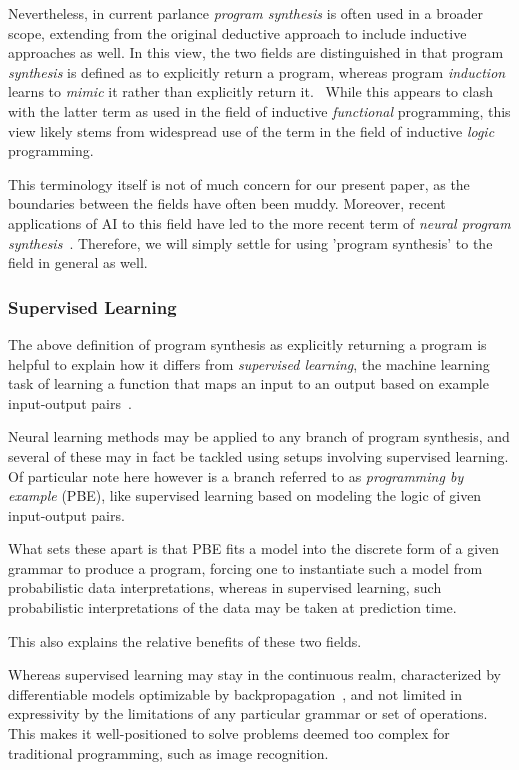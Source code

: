 \documentclass{article}
\begin{document}
Nevertheless, in current parlance \emph{program synthesis} is often used in a broader scope, extending from the original deductive approach to include inductive approaches as well. In this view, the two fields are distinguished in that program \emph{synthesis} is defined as to explicitly return a program, whereas program \emph{induction} learns to \emph{mimic} it rather than explicitly return it.~\citep{devlin2017robustfill,gulwani2017program,nps}
While this appears to clash with the latter term as used in the field of inductive \emph{functional} programming, this view likely stems from widespread use of the term in the field of inductive \emph{logic} programming.

This terminology itself is not of much concern for our present paper, as the boundaries between the fields have often been muddy.
Moreover, recent applications of AI to this field have led to the more recent term of \emph{neural program synthesis}~\citep{nps}. Therefore, we will simply settle for using 'program synthesis' to the field in general as well.

\subsubsection{Supervised Learning}

The above definition of program synthesis as explicitly returning a program is helpful to explain how it differs from \emph{supervised learning},
the machine learning task of learning a function that maps an input to an output based on example input-output pairs~\citep{russell2002artificial}.

Neural learning methods may be applied to any branch of program synthesis,
and several of these may in fact be tackled using setups involving supervised learning.
Of particular note here however is a branch referred to as \emph{programming by example} (PBE),
like supervised learning based on modeling the logic of given input-output pairs.

What sets these apart is that PBE fits a model into the discrete form of a given grammar to produce a program,
forcing one to instantiate such a model from probabilistic data interpretations,
whereas in supervised learning,
such probabilistic interpretations of the data may be taken at prediction time.

This also explains the relative benefits of these two fields.

Whereas supervised learning may stay in the continuous realm,
characterized by differentiable models optimizable by backpropagation~\citep{backproprnn},
and not limited in expressivity by the limitations of any particular grammar or set of operations.
This makes it well-positioned to solve problems deemed too complex for traditional programming, such as image recognition.
\end{document}
